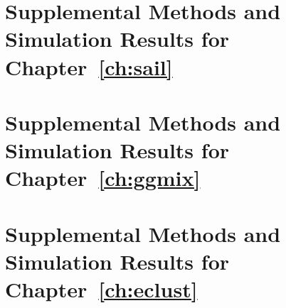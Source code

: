 \begin{appendices}


\chapter{Supplemental Methods and Simulation Results for Chapter~\ref{ch:sail}} \label{ap:sail}
\captionsetup{list=no}





\chapter{Supplemental Methods and Simulation Results for Chapter~\ref{ch:ggmix}} \label{ap:ggmix}
\captionsetup{list=no}





	
\chapter{Supplemental Methods and Simulation Results for Chapter~\ref{ch:eclust}} \label{ap:eclust}
\captionsetup{list=no}





\end{appendices}
